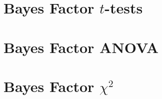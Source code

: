 \documentclass[
]{book}
\begin{document}
\hypertarget{bayes-factor-t-tests}{%
\chapter{\texorpdfstring{Bayes Factor \(t\)-tests}{Bayes Factor t-tests}}\label{bayes-factor-t-tests}}

\hypertarget{bayes-factor-anova}{%
\chapter{Bayes Factor ANOVA}\label{bayes-factor-anova}}

\hypertarget{bayes-factor-chi2}{%
\chapter{\texorpdfstring{Bayes Factor \(\chi^2\)}{Bayes Factor \textbackslash chi\^{}2}}\label{bayes-factor-chi2}}

  
\end{document}
